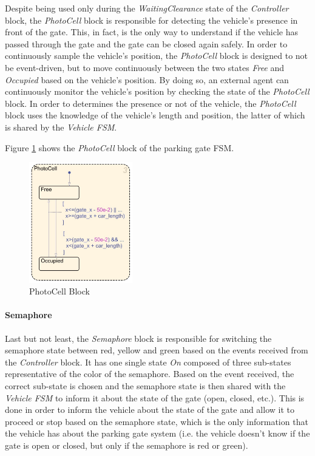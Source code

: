 Despite being used only during the \textit{WaitingClearance} state of the \textit{Controller} block, the \textit{PhotoCell} block is responsible for detecting the vehicle's presence in front of the gate.
This, in fact, is the only way to understand if the vehicle has passed through the gate and the gate can be closed again safely.
In order to continuously sample the vehicle's position, the \textit{PhotoCell} block is designed to not be event-driven, but to move continuously between the two states \textit{Free} and \textit{Occupied} based on the vehicle's position.
By doing so, an external agent can continuously monitor the vehicle's position by checking the state of the \textit{PhotoCell} block.
In order to determines the presence or not of the vehicle, the \textit{PhotoCell} block uses the knowledge of the vehicle's length and position, the latter of which is shared by the \textit{Vehicle FSM}.

Figure \ref{fig:photocell_block} shows the \textit{PhotoCell} block of the parking gate FSM.

\begin{figure}[H]
    \centering
    \includegraphics[width=0.4\textwidth]{./img/MATLAB/photocell_block.pdf}
    \caption{PhotoCell Block}
    \label{fig:photocell_block}
\end{figure}


\paragraph{Semaphore}

Last but not least, the \textit{Semaphore} block is responsible for switching the semaphore state between red, yellow and green based on the events received from the \textit{Controller} block.
It has one single state \textit{On} composed of  three sub-states representative of the color of the semaphore.
Based on the event received, the correct sub-state is chosen and the semaphore state is then shared with the \textit{Vehicle FSM} to inform it about the state of the gate (open, closed, etc.).
This is done in order to inform the vehicle about the state of the gate and allow it to proceed or stop based on the semaphore state, which is the only information that the vehicle has about the parking gate system (i.e. the vehicle doesn't know if the gate is open or closed, but only if the semaphore is red or green).

